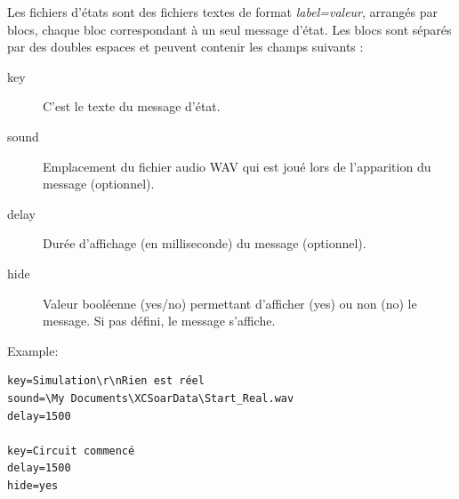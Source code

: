 Les fichiers d'états sont des fichiers textes de format {\em label=valeur}, arrangés par blocs, chaque bloc  correspondant à un seul message d'état. Les blocs sont séparés par des doubles espaces et peuvent contenir les champs suivants :
\begin{description}
\item[key]  C'est le texte du message d'état.
\item[sound] Emplacement du fichier audio WAV qui est joué lors de l'apparition du message (optionnel).
\item[delay] Durée d'affichage (en milliseconde) du message (optionnel).
\item[hide] Valeur booléenne (yes/no) permettant d'afficher (yes) ou non (no) le message. Si pas défini, le message s'affiche.
\end{description} 

Example:
\begin{verbatim}
key=Simulation\r\nRien est réel
sound=\My Documents\XCSoarData\Start_Real.wav
delay=1500

key=Circuit commencé
delay=1500
hide=yes
\end{verbatim}
% 

